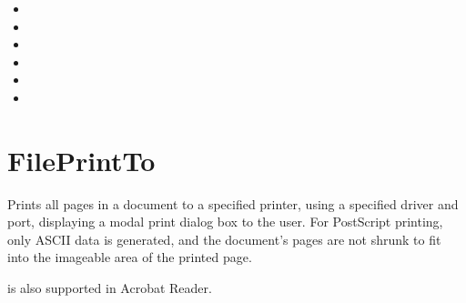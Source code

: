 \documentclass[letterpaper,12pt,english,openany,oneside]{sphinxmanual}
\begin{document}
\label{\detokenize{IAC_API_DDE_Messages:related-methods-23}}
\begin{itemize}
\item {} 

\item {} 

\item {} 

\item {} 

\item {} 

\item {} 

\end{itemize}




\section{FilePrintTo}
\label{\detokenize{IAC_API_DDE_Messages:id42}}
Prints all pages in a document to a specified printer, using a specified driver and port, displaying a modal print dialog box to the user. For PostScript printing, only ASCII data is generated, and the document’s pages are not shrunk to fit into the imageable area of the printed page.

 is also supported in Acrobat Reader.


\begin{sphinxVerbatim}[commandchars=\\\{\}]
\PYG{p}{[}   

                    \PYG{p}{]}
\end{sphinxVerbatim}
\label{\detokenize{IAC_API_DDE_Messages:parameters-24}}
\end{document}
